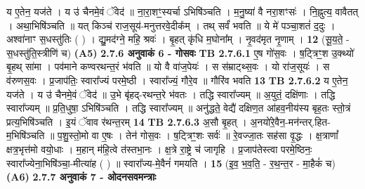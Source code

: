\documentclass[17pt]{extarticle}
\begin{document}
{                  य ए॒तेन॒ यज॑ते । य उ॑ चैनमे॒वं ॅवेद॑ ॥ ना॒रा॒शꣳ॒॒स्यर्चा ऽभिषि॑ञ्चति । म॒नु॒ष्या॑ वै नरा॒शꣳसः॑ । नि॒ह्नुत्य॒ वावैतत् । अथा॒भिषि॑ञ्चति ॥ यत् किञ्च॑ राज॒सूय॑-मनुत्तरवे॒दीक᳚म् । तथ् सर्वं॑ भवति ॥ ये मे॑ पञ्चा॒शतं॑ द॒दुः । अश्वा॑नाꣳ स॒धस्तु॑तिः ( ) । द्यु॒मद॑ग्ने॒ महि॒ श्रवः॑ । बृ॒हत् कृ॑धि म॒घोना᳚म् । नृ॒वद॑मृत नृ॒णाम् । \textbf{ 12} \newline
                  \newline
                                    (सू॒य॒ते॒ - स॒धस्तु॑ति॒स्त्रीणि॑ च) \textbf{(A5)} \newline \newline
                \textbf{ 2.7.6      अनुवाकं   6 - गोसवः} \newline
                                \textbf{ TB 2.7.6.1} \newline
                  ए॒ष गो॑स॒वः । ष॒ट्त्रिꣳ॒॒श उ॒क्थ्यो॑ बृ॒हथ् सा॑मा । पव॑माने कण्वरथन्त॒रं भ॑वति ॥ यो वै वा॑ज॒पेयः॑ । स स॑म्राट्थ्स॒वः । यो रा॑ज॒सूयः॑ । स व॑रुणस॒वः । प्र॒जाप॑तिः॒ स्वारा᳚ज्यं परमे॒ष्ठी । स्वारा᳚ज्यं॒ गौरे॒व ॥ गौरि॑व भवति \textbf{ 13} \newline
                  \newline
                                \textbf{ TB 2.7.6.2} \newline
                  य ए॒तेन॒ यज॑ते । य उ॑ चैनमे॒वं ॅवेद॑ ॥ उ॒भे बृ॑हद्-रथन्त॒रे भ॑वतः । तद्धि स्वारा᳚ज्यम् ॥ अ॒युतं॒ दक्षि॑णाः । तद्धि स्वारा᳚ज्यम् ॥ प्र॒ति॒धुषा॒ ऽभिषि॑ञ्चति । तद्धि स्वारा᳚ज्यम् ॥ अनु॑द्धते॒ वेद्यै॑ दक्षिण॒त आ॑हव॒नीय॑स्य बृह॒तः स्तो॒त्रं प्रत्य॒भिषि॑ञ्चति । इ॒यं ॅवाव र॑थन्त॒रम् \textbf{ 14} \newline
                  \newline
                                \textbf{ TB 2.7.6.3} \newline
                  अ॒सौ बृ॒हत् । अ॒नयो॑रे॒वैन॒-मन॑न्तर्.हित-म॒भिषि॑ञ्चति ॥ प॒शु॒स्तो॒मो वा ए॒षः । तेन॑ गोस॒वः । ष॒ट्त्रिꣳ॒॒शः सर्वः॑ ॥ रे॒वज्जा॒तः सह॑सा वृ॒द्धः । क्ष॒त्राणां᳚ क्षत्र॒भृत्त॑मो वयो॒धाः । म॒हान् म॑हि॒त्वे त॑स्तभा॒नः । क्ष॒त्रे रा॒ष्ट्रे च॑ जागृहि । प्र॒जाप॑तेस्त्वा परमे॒ष्ठिनः॒ स्वारा᳚ज्येना॒भिषि॑ञ्चा॒-मीत्या॑ह ( ) ॥ स्वारा᳚ज्य-मे॒वैनं॑ गमयति । \textbf{ 15} \newline
                  \newline
                                    (इ॒व॒ भ॒व॒ति॒ - र॒थ॒न्त॒र - मा॒हैकं॑ च) \textbf{(A6)} \newline \newline
                \textbf{ 2.7.7      अनुवाकं   7 - ओदनसवमन्त्राः} \newline
}
\end{document}
